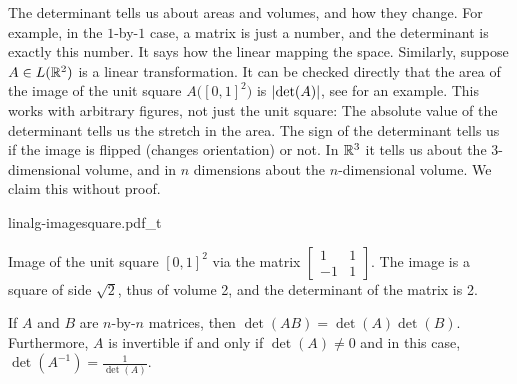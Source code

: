 The determinant tells us about areas and volumes, and how they change.
For example, in the $1$-by-$1$ case, a matrix is just a number, and the
determinant is exactly this number.  It says how the linear mapping
 the space.  Similarly,
suppose $A \in L({\mathbb{R}}^2)$ is a linear transformation.
It can be checked directly that
the area of the image of the unit square $A\bigl([0,1]^2\bigr)$ is
$\lvert {\det(A)} \rvert$, see  for an example.
This works with arbitrary figures, not just the unit
square:
The absolute value of the determinant tells us the stretch in the area.
The sign of the determinant tells us if the image is
flipped (changes orientation) or not.
In ${\mathbb{R}}^3$ it
tells us about the 3-dimensional volume, and in $n$ dimensions about the
$n$-dimensional volume.  We claim this without proof.
\begin{myfigureht}
{linalg-imagesquare.pdf_t}
\caption{Image of the unit square ${[0,1]}^2$ via the matrix
$\left[\begin{smallmatrix}1 & 1 \\ -1 & 1\end{smallmatrix}\right]$.
The image is a square of side $\sqrt{2}$, thus of volume 2, and the determinant of the
matrix is 2.\label{fig:imagesquare}}
\end{myfigureht}

\begin{prop}
If $A$ and $B$ are $n$-by-$n$ matrices, then $\det(AB) = \det(A)\det(B)$.
Furthermore, $A$ is invertible if and only if $\det(A) \not= 0$ and in
this case, $\det(A^{-1}) = \frac{1}{\det(A)}$.
\end{prop}

